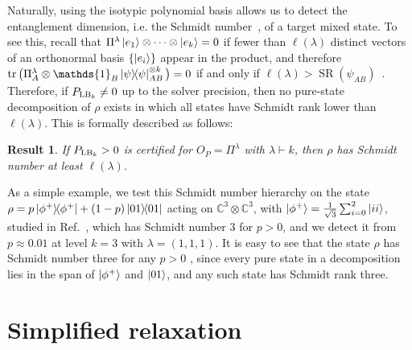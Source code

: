 \documentclass[aps,pra,twocolumn,superscriptaddress]{revtex4-2}
\newcommand{\one}{\mathds{1}}
\newcommand{\C}{\mathds{C}}
\newtheorem{result}[theorem]{Result}
\begin{document}
Naturally, using the isotypic polynomial basis allows us to detect the entanglement dimension, i.e. the Schmidt number~\cite{Terhal_2000}, of a target mixed state. To see this, recall that $\Pi^\lambda\ket{e_1}\otimes\dots\otimes\ket{e_k}=0$ if fewer than $\ell(\lambda)$ distinct vectors of an orthonormal basis $\{\ket{e_i}\}$ appear in the product, and therefore $\tr\big(\Pi^\lambda_A\otimes\one_B \dyad{\psi}_{AB}^{\otimes k}\big) = 0$ if and only if $\ell(\lambda) > \operatorname{SR}(\psi_{AB})$~\cite{Christandl_2005,lovitz2026TreeTNtest}.
Therefore, if $P_{{\rm LB}_k}\neq 0$ up to the solver precision, then no pure-state decomposition of $\rho$ exists in which all states have Schmidt rank lower than $\ell(\lambda)$. This is formally described as follows:
\begin{result}
   If $P_{{\rm LB}_k}> 0$ is certified for $O_P=\Pi^\lambda$ with $\lambda\vdash k$, then $\rho$ has Schmidt number at least $\ell(\lambda)$.
\end{result}
As a simple example, we test this Schmidt number hierarchy on the state $ \rho = p \dyad{\phi^+} + (1-p)\dyad{01}$ acting on $\C^3 \otimes \C^3$, with $\ket{\phi^+}=\frac{1}{\sqrt3}\sum_{i=0}^{2}\ket{ii}$, studied in Ref.~\cite{Tavakoli_2024}, which has Schmidt number $3$ for $p > 0$, and we detect it from $p\approx 0.01$ at level $k=3$ with $\lambda = (1,1,1)$.
It is easy to see that the state $\rho$ has Schmidt number three for any $p > 0$ , since every pure state in a decomposition lies in the span of $\ket{\phi^+}$ and $\ket{01}$, and any such state  has Schmidt rank three.

\section{Simplified relaxation}
\end{document}
